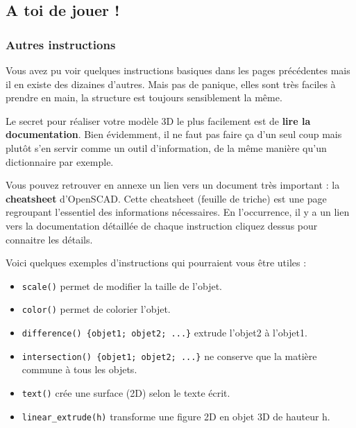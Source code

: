 


\subsection{A toi de jouer !}

\subsubsection{Autres instructions}

Vous avez pu voir quelques instructions basiques dans les pages précédentes mais il en existe des dizaines d'autres.
Mais pas de panique, elles sont très faciles à prendre en main, la structure est toujours sensiblement la même.

Le secret pour réaliser votre modèle 3D le plus facilement est de \textbf{lire la documentation}.
Bien évidemment, il ne faut pas faire ça d'un seul coup mais plutôt s'en servir comme un outil d'information, de la même manière qu'un dictionnaire par exemple.

Vous pouvez retrouver en annexe un lien vers un document très important : la \textbf{cheatsheet} d'OpenSCAD.
Cette cheatsheet (feuille de triche) est une page regroupant l'essentiel des informations nécessaires.
En l'occurrence, il y a un lien vers la documentation détaillée de chaque instruction cliquez dessus pour connaitre les détails.


\vspace{12pt}
Voici quelques exemples d'instructions qui pourraient vous être utiles :
\begin{itemize}
	\item \verb|scale()| permet de modifier la taille de l'objet.
	\item \verb|color()| permet de colorier l'objet.
	\item \verb|difference() {objet1; objet2; ...}| extrude l'objet2 à l'objet1.
	\item \verb|intersection() {objet1; objet2; ...}| ne conserve que la matière commune à tous les objets.
	\item \verb|text()| crée une surface (2D) selon le texte écrit.
	\item \verb|linear_extrude(h)| transforme une figure 2D en objet 3D de hauteur h.
\end{itemize}


